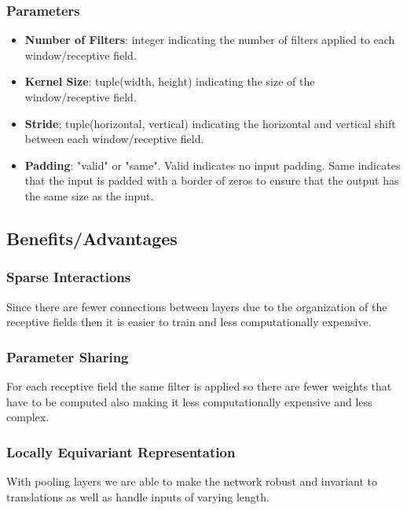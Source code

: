\documentclass[12pt]{article}
\begin{document}
        \subsubsection{Parameters}
            \begin{itemize}
                \item \textbf{Number of Filters}: integer indicating the number of filters applied to each window/receptive field.
                \item \textbf{Kernel Size}: tuple(width, height) indicating the size of the window/receptive field.
                \item \textbf{Stride}: tuple(horizontal, vertical) indicating the horizontal and vertical shift between
                each window/receptive field. 
                \item \textbf{Padding}: "valid" or "same". Valid indicates no input padding. Same indicates that the
                input is padded with a border of zeros to ensure that the output has the same size as the input.
            \end{itemize}
    
    \subsection{Benefits/Advantages}
        \subsubsection{Sparse Interactions}
            Since there are fewer connections between layers due to the organization of the receptive fields then it is
            easier to train and less computationally expensive.
        
        \subsubsection{Parameter Sharing}
            For each receptive field the same filter is applied so there are fewer weights that have to be computed also
            making it less computationally expensive and less complex.
        
        \subsubsection{Locally Equivariant Representation}
            With pooling layers we are able to make the network robust and invariant to translations as well as handle
            inputs of varying length.
\end{document}
